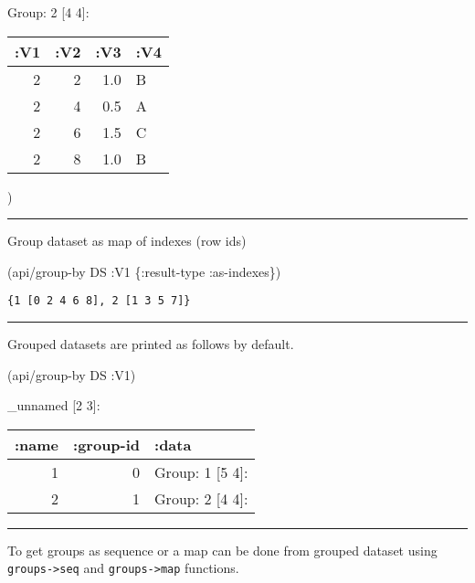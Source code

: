 \documentclass[]{article}
\newenvironment{Shaded}{\begin{snugshade}}{\end{snugshade}}
\newcommand{\AttributeTok}[1]{\textcolor[rgb]{0.77,0.63,0.00}{#1}}
\newcommand{\NormalTok}[1]{#1}
\begin{document}
Group: 2 {[}4 4{]}:

\begin{longtable}[]{@{}rrrl@{}}
\toprule
:V1 & :V2 & :V3 & :V4\tabularnewline
\midrule
\endhead
2 & 2 & 1.0 & B\tabularnewline
2 & 4 & 0.5 & A\tabularnewline
2 & 6 & 1.5 & C\tabularnewline
2 & 8 & 1.0 & B\tabularnewline
\bottomrule
\end{longtable}

)

\begin{center}\rule{0.5\linewidth}{0.5pt}\end{center}

Group dataset as map of indexes (row ids)

\begin{Shaded}
\begin{Highlighting}[]
\NormalTok{(api/group-by DS }\AttributeTok{:V1}\NormalTok{ \{}\AttributeTok{:result-type} \AttributeTok{:as-indexes}\NormalTok{\})}
\end{Highlighting}
\end{Shaded}

\begin{verbatim}
{1 [0 2 4 6 8], 2 [1 3 5 7]}
\end{verbatim}

\begin{center}\rule{0.5\linewidth}{0.5pt}\end{center}

Grouped datasets are printed as follows by default.

\begin{Shaded}
\begin{Highlighting}[]
\NormalTok{(api/group-by DS }\AttributeTok{:V1}\NormalTok{)}
\end{Highlighting}
\end{Shaded}

\_unnamed {[}2 3{]}:

\begin{longtable}[]{@{}rrl@{}}
\toprule
:name & :group-id & :data\tabularnewline
\midrule
\endhead
1 & 0 & Group: 1 {[}5 4{]}:\tabularnewline
2 & 1 & Group: 2 {[}4 4{]}:\tabularnewline
\bottomrule
\end{longtable}

\begin{center}\rule{0.5\linewidth}{0.5pt}\end{center}

To get groups as sequence or a map can be done from grouped dataset
using \texttt{groups-\textgreater{}seq} and
\texttt{groups-\textgreater{}map} functions.
\end{document}
